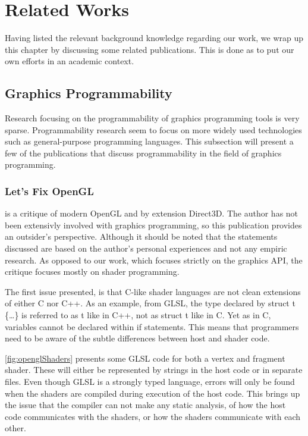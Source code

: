 \section{Related Works}\label{sec:related_works}
Having listed the relevant background knowledge regarding our work, we wrap up this chapter by discussing some related publications.
This is done as to put our own efforts in an academic context. 


\subsection{Graphics Programmability}
Research focusing on the programmability of graphics programming tools is very sparse.
Programmability research seem to focus on more widely used technologies such as general-purpose programming languages.
This subsection will present a few of the publications that discuss programmability in the field of graphics programming. 


\subsubsection{Let's Fix OpenGL}
\citet{fix_opengl} is a critique of modern OpenGL and by extension Direct3D.
The author has not been extensivly involved with graphics programming, so this publication provides an outsider’s perspective.
Although it should be noted that the statements discussed are based on the author’s personal experiences and not any empiric research. 
As opposed to our work, which focuses strictly on the graphics \gls{API}, the critique focuses mostly on shader programming.


The first issue presented, is that C-like shader languages are not clean extensions of either C nor C++.
As an example, from \gls{GLSL}, the type declared by struct t \{…\} is referred to as t like in C++, not as struct t like in C.
Yet as in C, variables cannot be declared within if statements. This means that programmers need to be aware of the subtle differences between host and shader code.

  
\cref{fig:openglShaders} presents some \gls{GLSL} code for both a vertex and fragment shader.
These will either be represented by strings in the host code or in separate files.
Even though \gls{GLSL} is a strongly typed language, errors will only be found when the shaders are compiled during execution of the host code.
This brings up the issue that the compiler can not make any static analysis, of how the host code communicates with the shaders, or how the shaders communicate with each other.


